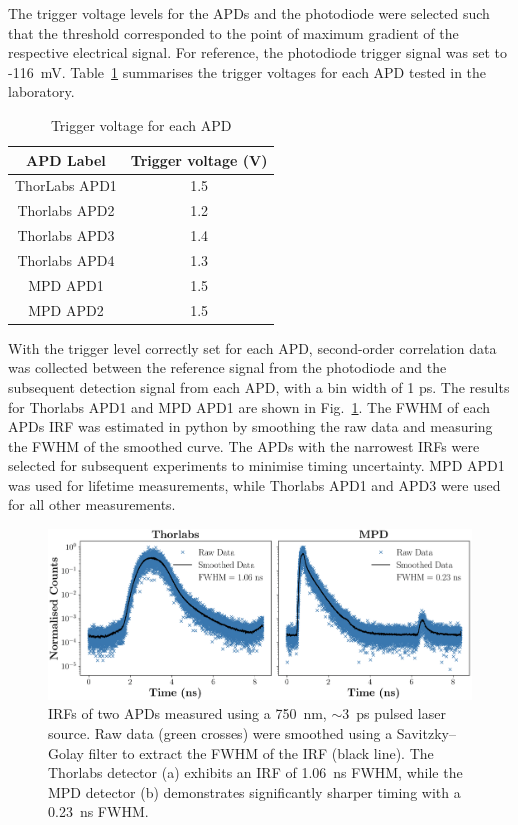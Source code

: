 The trigger voltage levels for the APDs and the photodiode were selected such that the threshold corresponded to the point of maximum gradient of the respective electrical signal. For reference, the photodiode trigger signal was set to -116~mV. Table~\ref{tab:apd_characterisatoin} summarises the trigger voltages for each APD tested in the laboratory.


\begin{table}[h!]
\centering
\begin{tabular}{|c|c|}
\hline
\textbf{APD Label} & \textbf{Trigger voltage (V)}  \\
\hline
ThorLabs APD1 &     1.5            \\
\hline
Thorlabs APD2 &      1.2         \\
\hline
Thorlabs APD3 &      1.4       \\
\hline
Thorlabs APD4 &      1.3         \\
\hline
MPD APD1 &     1.5               \\
\hline
MPD APD2 &     1.5             \\
\hline
\end{tabular}
\caption{Trigger voltage for each APD}
\label{tab:apd_characterisatoin}
\end{table}

With the trigger level correctly set for each APD, second-order correlation data was collected between the reference signal from the photodiode and the subsequent detection signal from each APD, with a bin width of 1 ps. The results for Thorlabs APD1 and MPD APD1 are shown in Fig.~\ref{fig:apd-characterisation}. The FWHM of each APDs IRF was estimated in python by smoothing the raw data and measuring the FWHM of the smoothed curve. The APDs with the narrowest IRFs were selected for subsequent experiments to minimise timing uncertainty. MPD APD1 was used for lifetime measurements, while Thorlabs APD1 and APD3 were used for all other measurements.


\begin{figure}[h]
    \centering
    \includegraphics[width=0.9\linewidth]{Figures/APDChar.png}
    \caption{IRFs of two APDs measured using a 750~nm, $\sim$3~ps pulsed laser source. Raw data (green crosses) were smoothed using a Savitzky–Golay filter to extract the FWHM of the IRF (black line). The Thorlabs detector (a) exhibits an IRF of 1.06~ns FWHM, while the MPD detector (b) demonstrates significantly sharper timing with a 0.23~ns FWHM.}
    \label{fig:apd-characterisation}
\end{figure}

